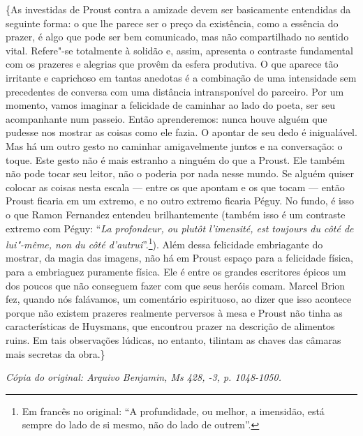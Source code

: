 \{As investidas de Proust contra a amizade devem ser basicamente entendidas
da seguinte forma: o que lhe parece ser o preço da existência, como a
essência do prazer, é algo que pode ser bem comunicado, mas não
compartilhado no sentido vital. Refere"-se totalmente à solidão e, assim,
apresenta o contraste fundamental com os prazeres e alegrias que provêm
da esfera produtiva. O que aparece tão irritante e caprichoso em tantas
anedotas é a combinação de uma intensidade sem precedentes de conversa
com uma distância intransponível do parceiro. Por um momento, vamos
imaginar a felicidade de caminhar ao lado do poeta, ser seu acompanhante
num passeio. Então aprenderemos: nunca houve alguém que pudesse nos
mostrar as coisas como ele fazia. O apontar de seu dedo é inigualável. Mas
há um outro gesto no caminhar amigavelmente juntos e na conversação: o toque. Este
gesto não é mais estranho a ninguém do que a Proust. Ele também não pode
tocar seu leitor, não o poderia por nada nesse mundo. Se alguém quiser
colocar as coisas nesta escala --- entre os que apontam e os que
tocam --- então Proust ficaria em um extremo, e no outro extremo ficaria
Péguy. No fundo, é isso o que Ramon Fernandez entendeu brilhantemente
(também isso é um contraste extremo com Péguy: ``\emph{La profondeur, ou
plutôt l'imensité, est toujours du côté de lui"-même, non du côté
d'autrui}''.\footnote{Em francês no original: ``A profundidade, ou melhor, a imensidão,
  está sempre do lado de si mesmo, não do lado de outrem''. \versal{[N. T.]}}). Além
dessa felicidade embriagante do mostrar, da magia das imagens, não há em
Proust espaço para a felicidade física, para a embriaguez puramente
física. Ele é entre os grandes escritores épicos um dos poucos que não
conseguem fazer com que seus heróis comam. Marcel Brion fez, quando nós
falávamos, um comentário espirituoso, ao dizer que isso acontece porque não
existem prazeres realmente perversos à mesa e Proust não tinha as
características de Huysmans, que encontrou prazer na descrição de
alimentos ruins. Em tais observações lúdicas, no entanto, tilintam as
chaves das câmaras mais secretas da obra.\}

\begin{flushright}
\emph{\small{Cópia do original: Arquivo Benjamin, Ms 428, -3, p. 1048-1050.}}
\end{flushright}

